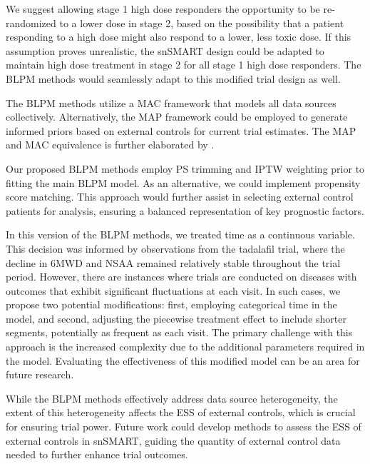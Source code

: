 We suggest allowing stage 1 high dose responders the opportunity to be re-randomized to a lower dose in stage 2, based on the possibility that a patient responding to a high dose might also respond to a lower, less toxic dose. If this assumption proves unrealistic, the \ac{snSMART} design could be adapted to maintain high dose treatment in stage 2 for all stage 1 high dose responders. The \ac{BLPM} methods would seamlessly adapt to this modified trial design as well.

The \ac{BLPM} methods utilize a \ac{MAC} framework that models all data sources collectively. Alternatively, the \ac{MAP} framework could be employed to generate informed priors based on external controls for current trial estimates. The \ac{MAP} and \ac{MAC} equivalence is further elaborated by \cite{schmidli2014robust}.

Our proposed \ac{BLPM} methods employ \ac{PS} trimming and \ac{IPTW} weighting prior to fitting the main \ac{BLPM} model. As an alternative, we could implement propensity score matching. This approach would further assist in selecting external control patients for analysis, ensuring a balanced representation of key prognostic factors.

In this version of the \ac{BLPM} methods, we treated time as a continuous variable. This decision was informed by observations from the tadalafil trial, where the decline in \ac{6MWD} and \ac{NSAA} remained relatively stable throughout the trial period. However, there are instances where trials are conducted on diseases with outcomes that exhibit significant fluctuations at each visit. In such cases, we propose two potential modifications: first, employing categorical time in the model, and second, adjusting the piecewise treatment effect to include shorter segments, potentially as frequent as each visit. The primary challenge with this approach is the increased complexity due to the additional parameters required in the model. Evaluating the effectiveness of this modified model can be an area for future research.

While the \ac{BLPM} methods effectively address data source heterogeneity, the extent of this heterogeneity affects the \ac{ESS} of external controls, which is crucial for ensuring trial power. Future work could develop methods to assess the \ac{ESS} of external controls in \ac{snSMART}, guiding the quantity of external control data needed to further enhance trial outcomes.
